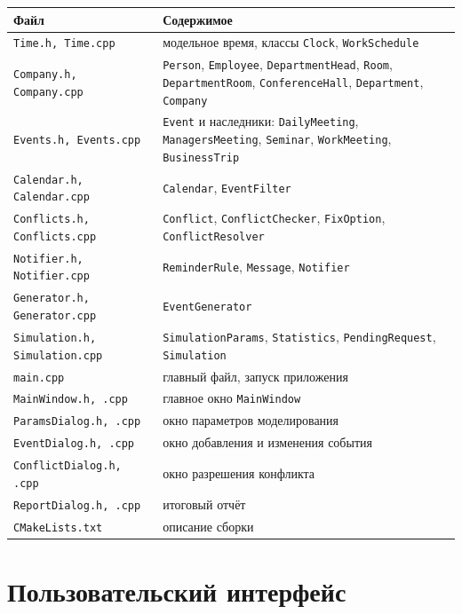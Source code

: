 \documentclass[12pt,a4paper]{article}
\begin{document}
\begin{center}
\begin{tabular}{p{5.2cm}p{9.8cm}}
\toprule
Файл & Содержимое \\
\midrule
\texttt{Time.h, Time.cpp} & модельное время, классы \texttt{Clock}, \texttt{WorkSchedule} \\
\texttt{Company.h, Company.cpp} & \texttt{Person}, \texttt{Employee}, \texttt{DepartmentHead},
  \texttt{Room}, \texttt{DepartmentRoom}, \texttt{ConferenceHall}, \texttt{Department},
  \texttt{Company} \\
\texttt{Events.h, Events.cpp} & \texttt{Event} и наследники: \texttt{DailyMeeting},
  \texttt{ManagersMeeting}, \texttt{Seminar}, \texttt{WorkMeeting}, \texttt{BusinessTrip} \\
\texttt{Calendar.h, Calendar.cpp} & \texttt{Calendar}, \texttt{EventFilter} \\
\texttt{Conflicts.h, Conflicts.cpp} & \texttt{Conflict}, \texttt{ConflictChecker},
  \texttt{FixOption}, \texttt{ConflictResolver} \\
\texttt{Notifier.h, Notifier.cpp} & \texttt{ReminderRule}, \texttt{Message}, \texttt{Notifier} \\
\texttt{Generator.h, Generator.cpp} & \texttt{EventGenerator} \\
\texttt{Simulation.h, Simulation.cpp} & \texttt{SimulationParams}, \texttt{Statistics},
  \texttt{PendingRequest}, \texttt{Simulation} \\
\midrule
\texttt{main.cpp} & главный файл, запуск приложения \\
\texttt{MainWindow.h, .cpp} & главное окно \texttt{MainWindow} \\
\texttt{ParamsDialog.h, .cpp} & окно параметров моделирования \\
\texttt{EventDialog.h, .cpp} & окно добавления и изменения события \\
\texttt{ConflictDialog.h, .cpp} & окно разрешения конфликта \\
\texttt{ReportDialog.h, .cpp} & итоговый отчёт \\
\texttt{CMakeLists.txt} & описание сборки \\
\bottomrule
\end{tabular}
\end{center}

\section{Пользовательский интерфейс}
\end{document}
